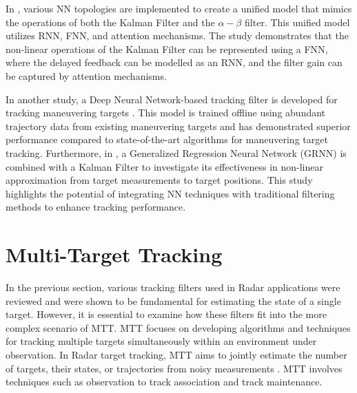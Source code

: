 In \cite{cui2022}, various \ac{NN} topologies are implemented to create a unified model that mimics the operations of both the Kalman Filter and the $\alpha-\beta$ filter. This unified model utilizes \ac{RNN}, \ac{FNN}, and attention mechanisms. The study demonstrates that the non-linear operations of the Kalman Filter can be represented using a \ac{FNN}, where the delayed feedback can be modelled as an \ac{RNN}, and the filter gain can be captured by attention mechanisms.

In another study, a Deep Neural Network-based tracking filter is developed for tracking maneuvering targets  \cite{Liu2019}. This model is trained offline using abundant trajectory data from existing maneuvering targets and has demonstrated superior performance compared to state-of-the-art algorithms for maneuvering target tracking. Furthermore, in \cite{Xu2023}, a Generalized Regression Neural Network (GRNN) is combined with a Kalman Filter to investigate its effectiveness in non-linear approximation from target measurements to target positions. This study highlights the potential of integrating \ac{NN} techniques with traditional filtering methods to enhance tracking performance.


\section{Multi-Target Tracking}
In the previous section, various tracking filters used in \ac{Radar} applications were reviewed and were shown to be fundamental for estimating the state of a single target. However, it is essential to examine how these filters fit into the more complex scenario of \ac{MTT}. \ac{MTT} focuses on developing algorithms and techniques for tracking multiple targets simultaneously within an environment under observation. In \ac{Radar} target tracking, \ac{MTT} aims to jointly estimate the number of targets, their states, or trajectories from noisy measurements \cite{Vo2015}. \ac{MTT} involves techniques such as observation to track association and track maintenance.

